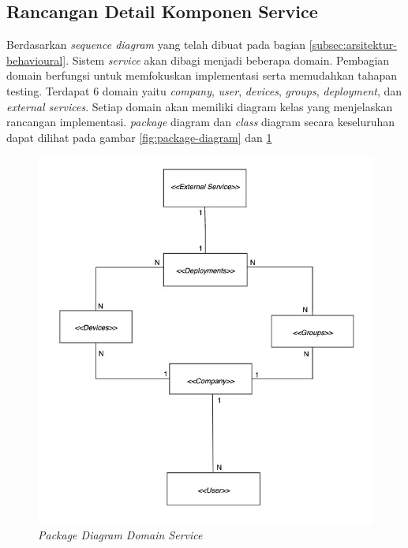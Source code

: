 \subsection{Rancangan Detail Komponen Service}
\label{sec:rancangan-service}

Berdasarkan \textit{sequence diagram} yang telah dibuat pada bagian \ref{subsec:arsitektur-behavioural}. Sistem \textit{service} akan dibagi menjadi beberapa domain. Pembagian domain berfungsi untuk memfokuskan implementasi serta memudahkan tahapan testing. Terdapat 6 domain yaitu \textit{company}, \textit{user}, \textit{devices}, \textit{groups}, \textit{deployment}, dan \textit{external services}. Setiap domain akan memiliki diagram kelas yang menjelaskan rancangan implementasi. \textit{package} diagram dan \textit{class} diagram secara keseluruhan dapat dilihat pada gambar \ref{fig:package-diagram} dan \ref{fig:package-class-domain-diagram}
\begin{figure}[ht]
  \centering
  \includegraphics[width=1\textwidth]{resources/chapter-3/class/class-diagram-overall.jpg}
  \caption{\textit{Package Diagram Domain Service}}
  \label{fig:package-class-domain-diagram}
\end{figure}

